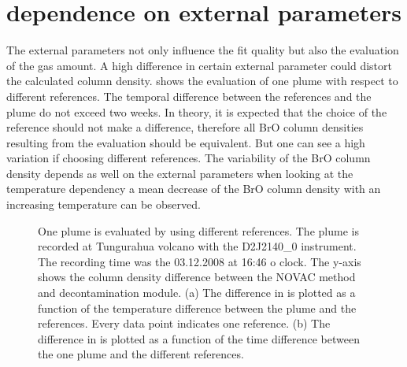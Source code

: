 \documentclass  [
  paper    = a4,
  BCOR     = 10mm,
  twoside,
  fontsize = 12pt,
  fleqn,
  toc      = bibnumbered,
  toc      = listofnumbered,
  numbers  = noendperiod,
  headings = normal,
  listof   = leveldown,
  version  = 3.03
]                                       {scrreprt}
\begin{document}
\section{  dependence on external parameters\label{Chap:BrOdep}}
The external parameters not only influence the fit quality but also the evaluation of the gas amount. A high difference in certain external parameter could distort the calculated   column density.  shows the evaluation of one plume with respect to different references. The temporal difference between the references and the plume do not exceed two weeks. In theory, it is expected that the choice of the reference should not make a difference, therefore all BrO column densities resulting from the evaluation should be equivalent. But one can see a high variation if choosing different references. The variability of the BrO column density depends as well on the external parameters when looking at the temperature dependency a mean decrease of the BrO column density with an increasing temperature can be observed.
\begin{figure}[h!]
	\caption[One plume is evaluated by using different references.  The y-axis shows the  SCD difference between the NOVAC routine and decontamination module. (a) The difference in   as a function of the temperature difference. (b) The difference in  as a function of the time difference between the one plume and the different references.]{One plume is evaluated by using different references. The plume is recorded at Tungurahua volcano with the D2J2140\_0 instrument. The recording time was the  03.12.2008  at 16:46 o clock. The y-axis shows the   column density difference between the NOVAC method and decontamination module. (a) The difference in   is plotted as a function of the temperature difference between the plume and the references. Every data point indicates one reference. (b) The difference in   is plotted as a function of the time difference between the one plume and the different references.}
	\label{fig:d2j2140060218difftemperature-cbro}        
\end{figure}
\end{document}
